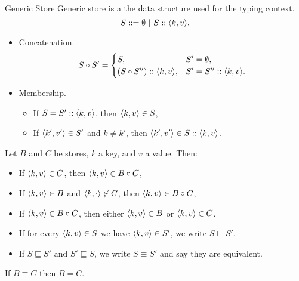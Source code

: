 \begin{frame}[allowframebreaks]{Generic Store}
    Generic store is a the data structure used for the typing context.
    \[
    S ::= \emptyset~|~S :: \langle k, v \rangle.
    \]
    
    \begin{itemize}
        \item Concatenation.
        \[
        S \circ S' =
        \begin{cases}
            S, & S' = \emptyset, \\
            (S \circ S'') :: \langle k, v \rangle, & S' = S'' :: \langle k, v \rangle.
        \end{cases}
        \]
        
        \item Membership.
        \begin{itemize}
            \item If $S = S' :: \langle k, v \rangle$, then $\langle k, v \rangle \in S$,
            \item If $\langle k', v' \rangle \in S'$ and $k \not= k'$, then $\langle k', v' \rangle \in S :: \langle k, v \rangle$. \qedhere
        \end{itemize}
    \end{itemize}
    
    \begin{lemma}
    Let $B$ and $C$ be stores, $k$ a key, and $v$ a value. Then:
    \begin{itemize}
        \item If $\langle k, v \rangle \in C$, then $\langle k, v \rangle \in B \circ C$,
        \item If $\langle k, v \rangle \in B$ and $\left\langle k, \cdot \right\rangle \not\in C$, then $\langle k, v \rangle \in B \circ C$,
        \item If $\langle k, v \rangle \in B \circ C$, then either $\langle k, v \rangle \in B$ or $\langle k, v \rangle \in C$.
    \end{itemize}
    \end{lemma}
    
    \begin{definition}[Equivalence]
        \begin{itemize}
            \item If for every $\langle k, v \rangle \in S$ we have $\langle k, v \rangle \in S'$, we write $S \sqsubseteq S'$.
            \item If $S \sqsubseteq S'$ and $S' \sqsubseteq S$, we write $S \equiv S'$ and say they are equivalent.
        \end{itemize}
    \end{definition}
    
    \begin{axiom}[Extensionality]
        If $B \equiv C$ then $B = C$.
    \end{axiom}
    

\end{frame}
